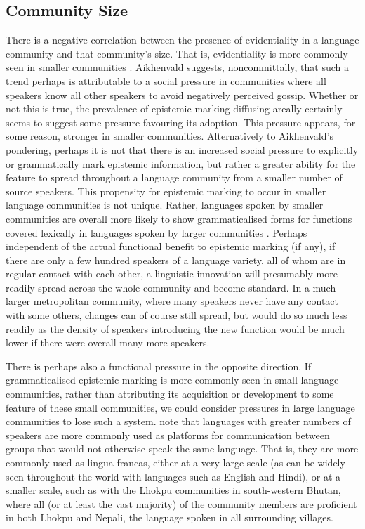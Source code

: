 \subsection{Community Size}\label{ss:History:CommunitySize}
There is a negative correlation between the presence of evidentiality in a language community and that community's size. That is, evidentiality is more commonly seen in smaller communities \cite[359]{Aikhenvald2004}. Aikhenvald suggests, noncommittally, that such a trend perhaps is attributable to a social pressure in communities where all speakers know all other speakers to avoid negatively perceived gossip. Whether or not this is true, the prevalence of epistemic marking diffusing areally certainly seems to suggest some pressure favouring its adoption. This pressure appears, for some reason, stronger in smaller communities. Alternatively to Aikhenvald's pondering, perhaps it is not that there is an increased social pressure to explicitly or grammatically mark epistemic information, but rather a greater ability for the feature to spread throughout a language community from a smaller number of source speakers. This propensity for epistemic marking to occur in smaller language communities is not unique. Rather, languages spoken by smaller communities are overall more likely to show grammaticalised forms for functions covered lexically in languages spoken by larger communities \cite{Lupyan2010}. Perhaps independent of the actual functional benefit to epistemic marking (if any), if there are only a few hundred speakers of a language variety, all of whom are in regular contact with each other, a linguistic innovation will presumably more readily spread across the whole community and become standard. In a much larger metropolitan community, where many speakers never have any contact with some others, changes can of course still spread, but would do so much less readily as the density of speakers introducing the new function would be much lower if there were overall many more speakers.

There is perhaps also a functional pressure in the opposite direction. If grammaticalised epistemic marking is more commonly seen in small language communities, rather than attributing its acquisition or development to some feature of these small communities, we could consider pressures in large language communities to lose such a system.  note that languages with greater numbers of speakers are more commonly used as platforms for communication between groups that would not otherwise speak the same language. That is, they are more commonly used as lingua francas, either at a very large scale (as can be widely seen throughout the world with languages such as English and Hindi), or at a smaller scale, such as with the Lhokpu communities in south-western Bhutan, where all (or at least the vast majority) of the community members are proficient in both Lhokpu and Nepali, the language spoken in all surrounding villages. 

